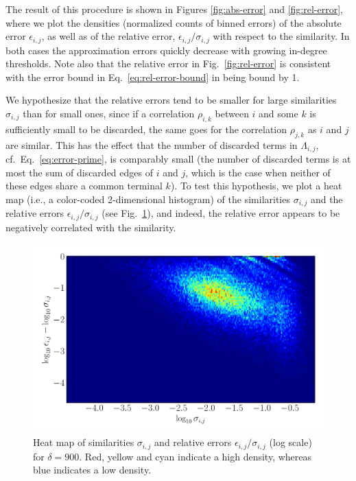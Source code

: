 \documentclass{kais}
\begin{document}
The result of this procedure is shown in Figures \ref{fig:abs-error} and \ref{fig:rel-error}, where we
plot the densities (normalized counts of binned errors) of the absolute error $\epsilon_{i,j}$, as well as of the relative error, 
$\epsilon_{i,j}/\sigma_{i,j}$ with respect to the similarity. In both cases the approximation
errors quickly decrease with growing in-degree thresholds. Note also that the relative error in 
Fig.\ \ref{fig:rel-error} is consistent with the error bound in Eq.\ \ref{eq:rel-error-bound} in being bound by 1.

We hypothesize that the relative errors tend to be smaller for large similarities $\sigma_{i,j}$ than for
 small ones, since if a correlation $\rho_{i,k}$ between $i$ and some $k$ is sufficiently small to be discarded,
the same goes for the correlation $\rho_{j,k}$  as $i$ and $j$ are similar. This has the effect that the number of
discarded terms in  $\Lambda_{i,j}$, cf.~Eq.~\ref{eq:error-prime}, is comparably small (the number 
of discarded terms is at most the sum of discarded edges of $i$ and $j$, which is the case when neither of these
edges share a common terminal $k$). To test this hypothesis, we plot a heat map (i.e., a color-coded 2-dimensional 
histogram) of the similarities $\sigma_{i,j}$ and the relative errors $\epsilon_{i,j}/\sigma_{i,j}$ (see Fig.\ \ref{fig:error-heatmap}), 
and indeed, the relative error appears to be negatively correlated with the similarity.

\begin{figure}
\centerline{\includegraphics[width=0.75\columnwidth]{figures/1446451652-relative_error-heatmap-900.pdf}}
\caption{Heat map of similarities $\sigma_{i,j}$ and relative errors $\epsilon_{i,j}/\sigma_{i,j}$ (log scale)
for $\delta = 900$. Red, yellow and cyan indicate a high density, whereas blue indicates a low density.}
\label{fig:error-heatmap}
\end{figure}
\end{document}
